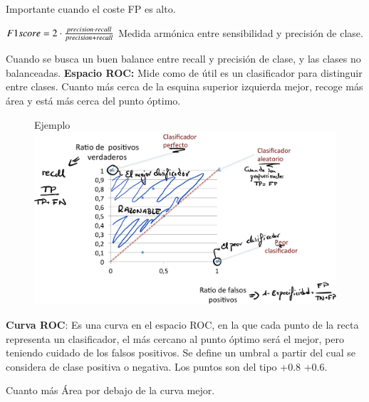 \documentclass[12pt]{report} %
\begin{document}
Importante cuando el coste FP es alto.

\(F1 \space score= 2\cdot \frac {precision \cdot recall}{precision +recall}\)
Medida armónica entre sensibilidad y precisión de clase.

Cuando se busca un buen balance entre recall y precisión de clase, y las
clases no balanceadas.
\newpage
\textbf{Espacio ROC:} Mide como de útil es un clasificador para
distinguir entre clases. Cuanto más cerca de la esquina superior
izquierda mejor, recoge más área y está más cerca del punto óptimo.
\begin{figure}[H]
	Ejemplo
	{\includegraphics[scale=.2]{Untitled 12.png}}
\end{figure}
\textbf{Curva ROC}: Es una curva en el espacio ROC, en la que cada punto
de la recta representa un clasificador, el más cercano al punto óptimo
será el mejor, pero teniendo cuidado de los falsos positivos. Se define
un umbral a partir del cual se considera de clase positiva o negativa.
Los puntos son del tipo +0.8 +0.6.

Cuanto más Área por debajo de la curva mejor.
\end{document}
